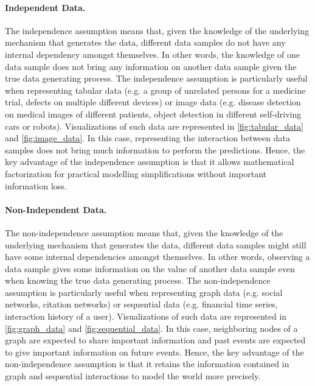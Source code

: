 \paragraph*{Independent Data.} The independence assumption means that, given the knowledge of the underlying mechanism that generates the data, different data samples do not have any internal dependency amongst themselves. In other words, the knowledge of one data sample does not bring any information on another data sample given the true data generating process.
The independence assumption is particularly useful when representing tabular data \cite{raschka2022chronology} (e.g. a group of unrelated persons for a medicine trial, defects on multiple different devices) or image data \cite{lu2020survey, litjens2017survey} (e.g. disease detection on medical images of different patients, object detection in different self-driving cars or robots). Visualizations of such data are represented in \cref{fig:tabular_data} and \cref{fig:image_data}.
In this case, representing the interaction between data samples does not bring much information to perform the predictions.
Hence, the key advantage of the independence assumption is that it allows mathematical factorization for practical modelling simplifications \citep{bishop} without important information loss.

\paragraph*{Non-Independent Data.} The non-independence assumption means that, given the knowledge of the underlying mechanism that generates the data, different data samples might still have some internal dependencies amongst themselves. In other words, observing a data sample gives some information on the value of another data sample even when knowing the true data generating process.
The non-independence assumption is particularly useful when representing graph data \cite{GNNBook2022} (e.g. social networks, citation networks) or sequential data \cite{shchur2021review, Dietterich2002Machine} (e.g. financial time series, interaction history of a user). Visualizations of such data are represented in \cref{fig:graph_data} and \cref{fig:sequential_data}.
In this case, neighboring nodes of a graph are expected to share important information and past events are expected to give important information on future events.
Hence, the key advantage of the non-independence assumption is that it retains the information contained in graph and sequential interactions to model the world more precisely.

